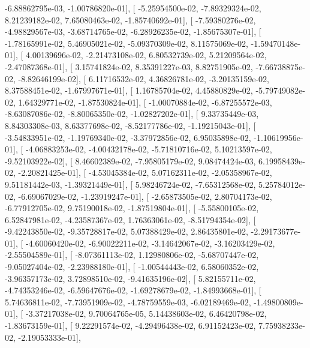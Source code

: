 \documentclass{article}
\begin{document}
         -6.88862795e-03,  -1.00786820e-01],
       [ -5.25954500e-02,  -7.89329324e-02,   8.21239182e-02,
          7.65080463e-02,  -1.85740692e-01],
       [ -7.59380276e-02,  -4.98829567e-03,  -3.68714765e-02,
         -6.28926235e-02,  -1.85675307e-01],
       [ -1.78165991e-02,   5.46905021e-02,  -5.09370309e-02,
          8.11575069e-02,  -1.59470148e-01],
       [  4.00139696e-02,  -2.21473108e-02,   6.80532739e-02,
          5.21209564e-02,  -2.47087368e-01],
       [  3.15741824e-02,   8.35391227e-03,   8.82751905e-02,
         -7.66738875e-02,  -8.82646199e-02],
       [  6.11716532e-02,   4.36826781e-02,  -3.20135159e-02,
          8.37588451e-02,  -1.67997671e-01],
       [  1.16785704e-02,   4.45880829e-02,  -5.79749082e-02,
          1.64329771e-02,  -1.87530824e-01],
       [ -1.00070884e-02,  -6.87255572e-03,  -8.63087086e-02,
         -8.80065350e-02,  -1.02827202e-01],
       [  9.33735449e-03,   8.84303308e-03,   8.63377698e-02,
         -8.52177786e-02,  -1.19215043e-01],
       [ -3.54833951e-02,  -1.19769340e-02,  -3.37972856e-02,
          6.95035898e-02,  -1.10619956e-01],
       [ -4.06883253e-02,  -4.00432178e-02,  -5.71810716e-02,
          5.10213597e-02,  -9.52103922e-02],
       [  8.46602389e-02,  -7.95805179e-02,   9.08474424e-03,
          6.19958439e-02,  -2.20821425e-01],
       [ -4.53045384e-02,   5.07162311e-02,  -2.05358967e-02,
          9.51181442e-03,  -1.39321449e-01],
       [  5.98246724e-02,  -7.65312568e-02,   5.25784012e-02,
         -6.69067029e-02,  -1.23919247e-01],
       [ -2.65873505e-02,   2.80704173e-02,  -6.77912705e-02,
          9.75190018e-02,  -1.87519804e-01],
       [ -5.55800105e-02,   6.52847981e-02,  -4.23587367e-02,
          1.76363061e-02,  -8.51794354e-02],
       [ -9.42243850e-02,  -9.35728817e-02,   5.07388429e-02,
          2.86435801e-02,  -2.29173677e-01],
       [ -4.60060420e-02,  -6.90022211e-02,  -3.14642067e-02,
         -3.16203429e-02,  -2.55504589e-01],
       [ -8.07361113e-02,   1.12980806e-02,  -5.68707447e-02,
         -9.05027404e-02,  -2.23988180e-01],
       [ -1.00544443e-02,   6.58060352e-02,  -3.96357173e-02,
          3.72898510e-02,  -9.41635196e-02],
       [  5.82155711e-02,  -4.74353246e-02,  -6.59647676e-02,
         -1.69278679e-02,  -1.84993668e-01],
       [  5.74636811e-02,  -7.73951909e-02,  -4.78759559e-03,
         -6.02189469e-02,  -1.49800809e-01],
       [ -3.37217038e-02,   9.70064765e-05,   5.14438603e-02,
          6.46420798e-02,  -1.83673159e-01],
       [  9.22291574e-02,  -4.29496438e-02,   6.91152423e-02,
          7.75938233e-02,  -2.19053333e-01],
\end{document}
